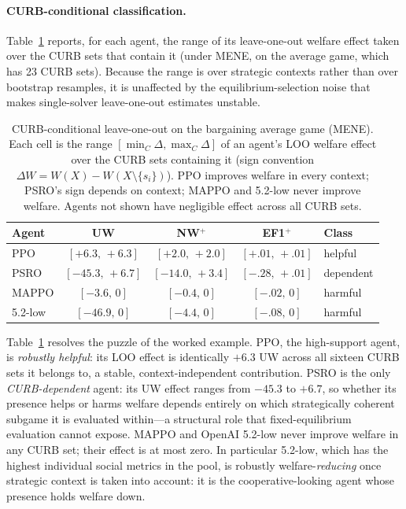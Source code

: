 \documentclass[sigconf,anonymous]{aamas}
\begin{document}
\paragraph{CURB-conditional classification.} Table~\ref{tab:curb-bargaining} reports, for each agent, the range of its leave-one-out welfare effect taken over the CURB sets that contain it (under MENE, on the average game, which has 23 CURB sets). Because the range is over strategic contexts rather than over bootstrap resamples, it is unaffected by the equilibrium-selection noise that makes single-solver leave-one-out estimates unstable.

\begin{table}[t]
\caption{CURB-conditional leave-one-out on the bargaining average game (MENE). Each cell is the range $[\min_C \Delta, \max_C \Delta]$ of an agent's LOO welfare effect over the CURB sets containing it (sign convention $\Delta W = W(X) - W(X\setminus\{s_i\})$). PPO improves welfare in every context; PSRO's sign depends on context; MAPPO and 5.2-low never improve welfare. Agents not shown have negligible effect across all CURB sets.}
\label{tab:curb-bargaining}
\small
\begin{tabular}{lccc l}
\hline
Agent & UW & NW$^+$ & EF1$^+$ & Class \\
\hline
PPO     & $[+6.3,\,+6.3]$ & $[+2.0,\,+2.0]$ & $[+.01,\,+.01]$ & helpful \\
PSRO    & $[-45.3,\,+6.7]$ & $[-14.0,\,+3.4]$ & $[-.28,\,+.01]$ & dependent \\
MAPPO   & $[-3.6,\,0]$ & $[-0.4,\,0]$ & $[-.02,\,0]$ & harmful \\
5.2-low & $[-46.9,\,0]$ & $[-4.4,\,0]$ & $[-.08,\,0]$ & harmful \\
\hline
\end{tabular}
\end{table}

Table~\ref{tab:curb-bargaining} resolves the puzzle of the worked example. PPO, the high-support agent, is \emph{robustly helpful}: its LOO effect is identically $+6.3$ UW across all sixteen CURB sets it belongs to, a stable, context-independent contribution. PSRO is the only \emph{CURB-dependent} agent: its UW effect ranges from $-45.3$ to $+6.7$, so whether its presence helps or harms welfare depends entirely on which strategically coherent subgame it is evaluated within---a structural role that fixed-equilibrium evaluation cannot expose. MAPPO and OpenAI 5.2-low never improve welfare in any CURB set; their effect is at most zero. In particular 5.2-low, which has the highest individual social metrics in the pool, is robustly welfare-\emph{reducing} once strategic context is taken into account: it is the cooperative-looking agent whose presence holds welfare down.
\end{document}
